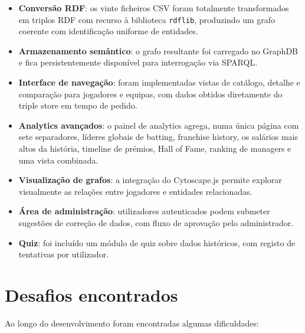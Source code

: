 \begin{itemize}[leftmargin=*]
  \item \textbf{Convers\~ao RDF}: os vinte ficheiros CSV foram totalmente transformados em triplos RDF com recurso \`a biblioteca \texttt{rdflib}, produzindo um grafo coerente com identifica\c{c}\~ao uniforme de entidades.
  \item \textbf{Armazenamento sem\^antico}: o grafo resultante foi carregado no GraphDB e fica persistentemente dispon\'ivel para interroga\c{c}\~ao via SPARQL.
  \item \textbf{Interface de navega\c{c}\~ao}: foram implementadas vistas de cat\'alogo, detalhe e compara\c{c}\~ao para jogadores e equipas, com dados obtidos diretamente do triple store em tempo de pedido.
  \item \textbf{Analytics avan\c{c}ados}: o painel de analytics agrega, numa \'unica p\'agina com sete separadores, l\'ideres globais de batting, franchise history, os sal\'arios mais altos da hist\'oria, timeline de pr\'emios, Hall of Fame, ranking de managers e uma vista combinada.
  \item \textbf{Visualiza\c{c}\~ao de grafos}: a integra\c{c}\~ao do Cytoscape.js permite explorar visualmente as rela\c{c}\~oes entre jogadores e entidades relacionadas.
  \item \textbf{\'Area de administra\c{c}\~ao}: utilizadores autenticados podem submeter sugest\~oes de corre\c{c}\~ao de dados, com fluxo de aprova\c{c}\~ao pelo administrador.
  \item \textbf{Quiz}: foi inclu\'ido um m\'odulo de quiz sobre dados hist\'oricos, com registo de tentativas por utilizador.
\end{itemize}

\section{Desafios encontrados}

Ao longo do desenvolvimento foram encontradas algumas dificuldades:

